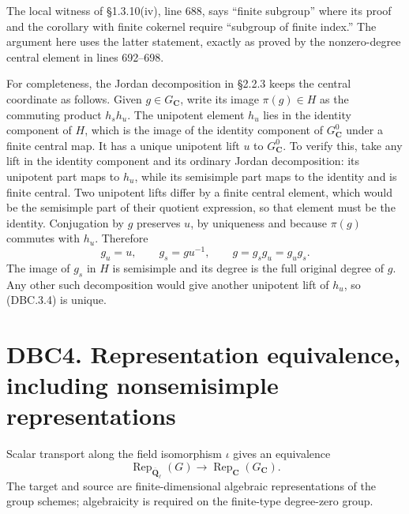 \documentclass[
]{report}
\begin{document}
The local witness of §1.3.10(iv), line 688, says ``finite subgroup''
where its proof and the corollary with finite cokernel require
``subgroup of finite index.'' The argument here uses the latter
statement, exactly as proved by the nonzero-degree central element in
lines 692--698.

For completeness, the Jordan decomposition in §2.2.3 keeps the central
coordinate as follows. Given \(g\in G_{\mathbf C}\), write its image
\(\pi(g)\in H\) as the commuting product \(h_s h_u\). The unipotent
element \(h_u\) lies in the identity component of \(H\), which is the
image of the identity component of \(G_{\mathbf C}^{0}\) under a finite
central map. It has a unique unipotent lift \(u\) to
\(G_{\mathbf C}^{0}\). To verify this, take any lift in the identity
component and its ordinary Jordan decomposition: its unipotent part maps
to \(h_u\), while its semisimple part maps to the identity and is finite
central. Two unipotent lifts differ by a finite central element, which
would be the semisimple part of their quotient expression, so that
element must be the identity. Conjugation by \(g\) preserves \(u\), by
uniqueness and because \(\pi(g)\) commutes with \(h_u\). Therefore \[
g_u=u,\qquad g_s=g u^{-1},\qquad g=g_sg_u=g_ug_s.
\tag{DBC.3.4}
\] The image of \(g_s\) in \(H\) is semisimple and its degree is the
full original degree of \(g\). Any other such decomposition would give
another unipotent lift of \(h_u\), so (DBC.3.4) is unique.

\section{DBC4. Representation equivalence, including nonsemisimple
representations}\label{dbc4.-representation-equivalence-including-nonsemisimple-representations}

Scalar transport along the field isomorphism \(\iota\) gives an
equivalence \[
\operatorname{Rep}_{\overline{\mathbf Q}_\ell}(G)
\longrightarrow\operatorname{Rep}_{\mathbf C}(G_{\mathbf C}).
\tag{DBC.4.1}
\] The target and source are finite-dimensional algebraic
representations of the group schemes; algebraicity is required on the
finite-type degree-zero group.
\end{document}
